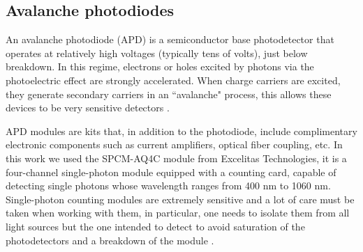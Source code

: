 \documentclass[12pt]{book}
\begin{document}
\begin{figure}[t!]
\begin{floatrow}
\end{floatrow}
\end{figure}


\subsection{Avalanche photodiodes}

An avalanche photodiode (APD) is a semiconductor base photodetector that operates at relatively high voltages (typically tens of volts), just below breakdown. In this regime, electrons or holes excited by photons via the photoelectric effect are strongly accelerated. When charge carriers are excited, they generate secondary carriers in an ``avalanche" process, this allows these devices to be very sensitive detectors \cite{bachor}.

APD modules are kits that, in addition to the photodiode, include complimentary electronic components such as current amplifiers, optical fiber coupling, etc. In this work we used the SPCM-AQ4C module from Excelitas Technologies, it is a four-channel single-photon module equipped with a counting card, capable of detecting single photons whose wavelength ranges from 400 nm to 1060 nm. Single-photon counting modules are extremely sensitive and a lot of care must be taken when working with them, in particular, one needs to isolate them from all light sources but the one intended to detect to avoid saturation of the photodetectors and a breakdown of the module \cite{manual}.
\end{document}
